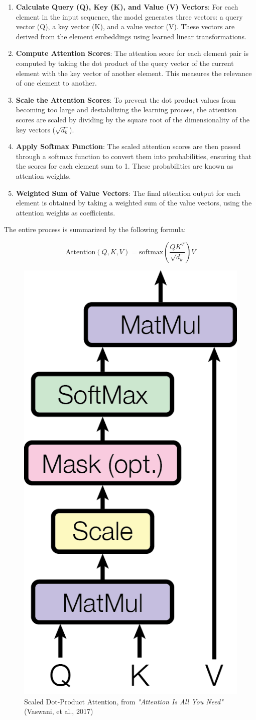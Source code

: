 \begin{enumerate}
    \item \textbf{Calculate Query (Q), Key (K), and Value (V) Vectors}: For each element in the input sequence, the model generates three vectors: a query vector (Q), a key vector (K), and a value vector (V). These vectors are derived from the element embeddings using learned linear transformations.
    \item \textbf{Compute Attention Scores}: The attention score for each element pair is computed by taking the dot product of the query vector of the current element with the key vector of another element. This measures the relevance of one element to another.
    \item \textbf{Scale the Attention Scores}: To prevent the dot product values from becoming too large and destabilizing the learning process, the attention scores are scaled by dividing by the square root of the dimensionality of the key vectors ($\sqrt{d_k}$).
    \item \textbf{Apply Softmax Function}: The scaled attention scores are then passed through a softmax function to convert them into probabilities, ensuring that the scores for each element sum to 1. These probabilities are known as attention weights.
    \item \textbf{Weighted Sum of Value Vectors}: The final attention output for each element is obtained by taking a weighted sum of the value vectors, using the attention weights as coefficients.
\end{enumerate}

The entire process is summarized by the following formula:

\begin{equation}
\text{Attention}(Q, K, V) = \text{softmax}\left(\frac{QK^T}{\sqrt{d_k}}\right)V
\end{equation}

\begin{figure}[htbp]
    \centering
    \includegraphics[width=3 cm]{3_ChapterTranformerVariants/figuras/ScaledDotProductAttention.png}
    \caption{Scaled Dot-Product Attention, from \textit{"Attention Is All You Need"} (Vaswani, et al., 2017) \cite{vaswani2023attention}}
    \end{figure}

